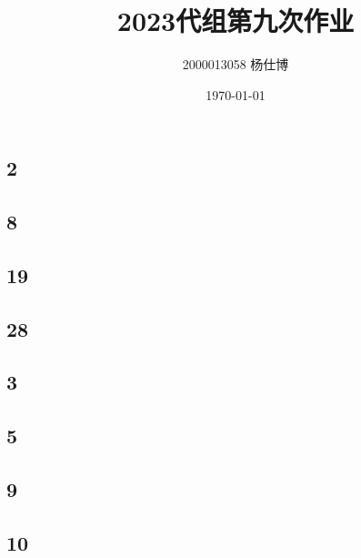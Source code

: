 \documentclass[UTF8]{ctexart}
\title{\vspace{-4cm}2023代组第九次作业}
\author{2000013058 杨仕博}
\date{\today}
\begin{document}
\maketitle

\subsection*{2}

\subsection*{8}

\subsection*{19}

\subsection*{28}

\subsection*{3}

\subsection*{5}

\subsection*{9}

\subsection*{10}
\end{document}
